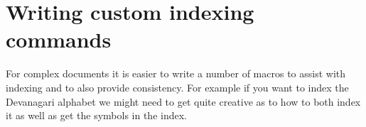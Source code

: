 \section{Writing custom indexing commands}

For complex documents it is easier to write a number of macros to assist with indexing and to also provide consistency. For example if you want to index the Devanagari alphabet we might need to get quite creative as to how to both index it as well as get the symbols in the index.
\DeclareRobustCommand\ta{{\tibetan ༃ }}

%
%
%
























